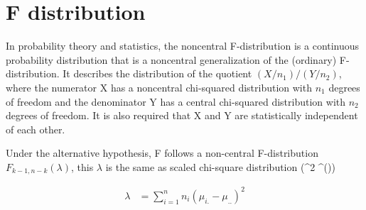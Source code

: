 \section{F distribution}

In probability theory and statistics, the noncentral F-distribution is a continuous probability distribution that is a noncentral generalization of the (ordinary) F-distribution. It describes the distribution of the quotient 
$(X / n_1)/(Y / n_2)$, where the numerator X has a noncentral chi-squared distribution with $n_1$ degrees of freedom and the denominator Y has a central chi-squared distribution with $n_2$ degrees of freedom. It is also required that X and Y are statistically independent of each other.


Under the alternative hypothesis, F follows a non-central F-distribution $F_{k-1, n-k}(\lambda)$, this $\lambda$ is the same as scaled chi-square distribution (\sigma^2 \chi^(\lambda))

\begin{align*}
\lambda &= \sum_{i=1}^n n_i (\mu_{i.} - \mu_{..})^2
\end{align*}
